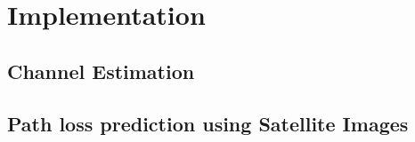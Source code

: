 \chapter{Implementation}\label{app:implementation}

\section{Channel Estimation}\label{app:impl_channel_estimation}

\section{Path loss prediction using Satellite Images}
